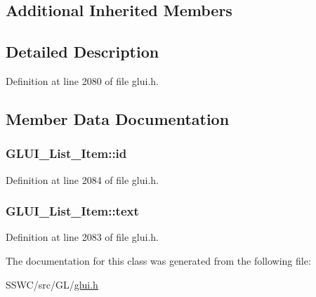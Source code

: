 \subsection*{Additional Inherited Members}


\subsection{Detailed Description}


Definition at line 2080 of file glui.\+h.



\subsection{Member Data Documentation}
\hypertarget{class_g_l_u_i___list___item_a329b7a460a0e449e4bb0bdc2e8ba519c}{
\subsubsection[{id}]{ G\+L\+U\+I\+\_\+\+List\+\_\+\+Item\+::id}}\label{class_g_l_u_i___list___item_a329b7a460a0e449e4bb0bdc2e8ba519c}


Definition at line 2084 of file glui.\+h.

\hypertarget{class_g_l_u_i___list___item_a8d7db7c4b7dd085352de5d1a6b849da2}{
\subsubsection[{text}]{ G\+L\+U\+I\+\_\+\+List\+\_\+\+Item\+::text}}\label{class_g_l_u_i___list___item_a8d7db7c4b7dd085352de5d1a6b849da2}


Definition at line 2083 of file glui.\+h.



The documentation for this class was generated from the following file\+:\begin{DoxyCompactItemize}
\item 
S\+S\+W\+C/src/\+G\+L/\hyperlink{glui_8h}{glui.\+h}\end{DoxyCompactItemize}
